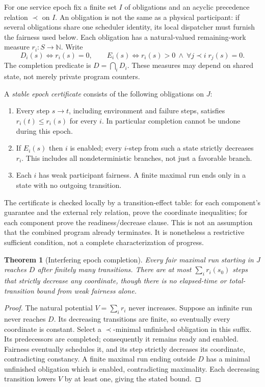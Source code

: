 \documentclass[11pt]{article}
\newtheorem{theorem}{Theorem}[section]
\begin{document}
For one service epoch fix a finite set $I$ of obligations and an acyclic precedence relation $\prec$ on $I$. An obligation is not the same as a physical participant: if several obligations share one scheduler identity, its local dispatcher must furnish the fairness used below. Each obligation has a natural-valued remaining-work measure $r_i:S\to\mathbb N$. Write
\[
 D_i(s)\iff r_i(s)=0,\qquad E_i(s)\iff r_i(s)>0\ \land\ \forall j\prec i\;r_j(s)=0.
\]
The completion predicate is $D=\bigcap_iD_i$. These measures may depend on shared state, not merely private program counters.

A \emph{stable epoch certificate} consists of the following obligations on $J$:
\begin{enumerate}
\item Every step $s\to t$, including environment and failure steps, satisfies $r_i(t)\le r_i(s)$ for every $i$. In particular completion cannot be undone during this epoch.
\item If $E_i(s)$ then $i$ is enabled; every $i$-step from such a state strictly decreases $r_i$. This includes all nondeterministic branches, not just a favorable branch.
\item Each $i$ has weak participant fairness. A finite maximal run ends only in a state with no outgoing transition.
\end{enumerate}
The certificate is checked locally by a transition-effect table: for each component's guarantee and the external rely relation, prove the coordinate inequalities; for each component prove the readiness/decrease clause. This is not an assumption that the combined program already terminates. It is nonetheless a restrictive sufficient condition, not a complete characterization of progress.

\begin{theorem}[Interfering epoch completion]\label{progress:th:epoch}
Every fair maximal run starting in $J$ reaches $D$ after finitely many transitions. There are at most $\sum_i r_i(s_0)$ steps that strictly decrease any coordinate, though there is no elapsed-time or total-transition bound from weak fairness alone.
\end{theorem}
\begin{proof}
The natural potential $V=\sum_i r_i$ never increases. Suppose an infinite run never reaches $D$. Its decreasing transitions are finite, so eventually every coordinate is constant. Select a $\prec$-minimal unfinished obligation in this suffix. Its predecessors are completed; consequently it remains ready and enabled. Fairness eventually schedules it, and its step strictly decreases its coordinate, contradicting constancy. A finite maximal run ending outside $D$ has a minimal unfinished obligation which is enabled, contradicting maximality. Each decreasing transition lowers $V$ by at least one, giving the stated bound.
\end{proof}
\end{document}
